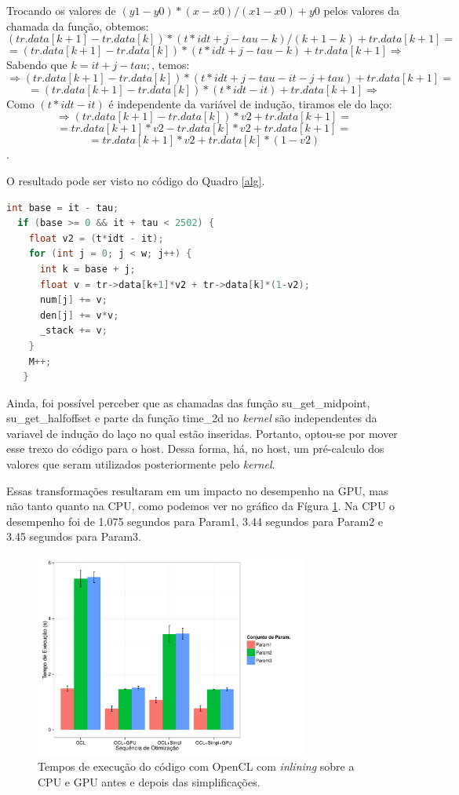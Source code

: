 \documentclass[12pt]{article}
\begin{document}
Trocando os valores de $(y1 - y0) * (x - x0) / (x1 - x0) + y0$ pelos valores da chamada da função, obtemos: 
$$(tr.data[k+1] - tr.data[k]) * (t*idt + j - tau - k) / (k + 1 - k) + tr.data[k+1] = $$
$$ = (tr.data[k+1] - tr.data[k]) * (t*idt + j - tau - k) + tr.data[k+1] \Rightarrow $$
Sabendo que $k = it + j - tau;$, temos:
$$ \Rightarrow (tr.data[k+1] - tr.data[k]) * (t*idt + j - tau - it - j + tau) + tr.data[k+1] = $$
$$ = (tr.data[k+1] - tr.data[k]) * (t*idt - it) + tr.data[k+1] \Rightarrow$$
Como $(t*idt - it)$ é independente da variável de indução, tiramos ele do laço:
$$ \Rightarrow (tr.data[k+1] - tr.data[k]) * v2 + tr.data[k+1] =$$
$$ = tr.data[k+1]*v2 - tr.data[k]*v2 + tr.data[k+1] = $$
$$ = tr.data[k+1]*v2 + tr.data[k]*(1-v2)$$.

O resultado pode ser visto no código do Quadro \ref{alg}.\\

\begin{lstlisting}[language=c, caption=Estrutura su\_trace depois de compactada., label=alg]
  int base = it - tau;
  if (base >= 0 && it + tau < 2502) {
    float v2 = (t*idt - it);
    for (int j = 0; j < w; j++) {
      int k = base + j;
      float v = tr->data[k+1]*v2 + tr->data[k]*(1-v2);
      num[j] += v;
      den[j] += v*v;
      _stack += v;
    }
    M++;
   }
\end{lstlisting}

Ainda, foi possível perceber que as chamadas das função su\_get\_midpoint, su\_get\_halfoffset e parte da função time\_2d no \textit{kernel} são independentes da variavel de indução do laço no qual estão inseridas. Portanto, optou-se por mover esse trexo do código para o host. Dessa forma, há, no host, um pré-calculo dos valores que seram utilizados posteriormente pelo \textit{kernel}.

Essas transformações resultaram em um impacto no desempenho na GPU, mas não tanto quanto na CPU, como podemos ver no gráfico da Fígura \ref{fgclsimpl}. Na CPU o desempenho foi de 1.075 segundos para Param1, 3.44 segundos para Param2 e 3.45 segundos para Param3.

\begin{figure}[H]
\centering
\includegraphics[width=0.8\textwidth]{oclsimpl.pdf}
\caption{Tempos de execução do código com OpenCL com \textit{inlining} sobre a CPU e GPU antes e depois das simplificações.}
\label{fgclsimpl}
\end{figure}
\end{document}
